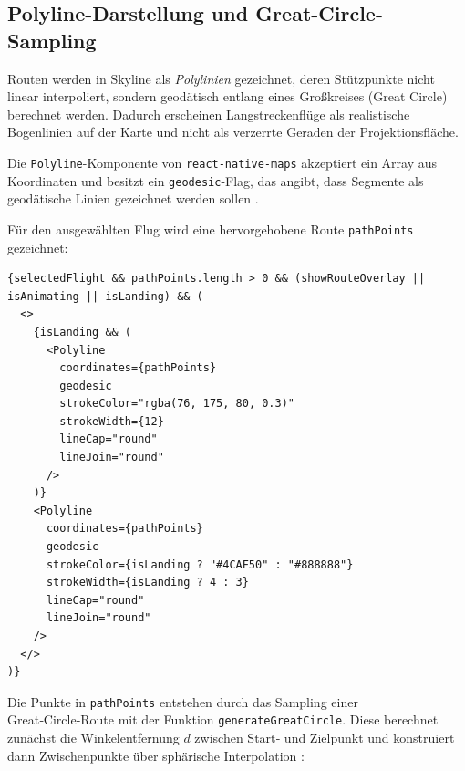 \subsection{Polyline-Darstellung und Great-Circle-Sampling}

Routen werden in Skyline als \emph{Polylinien} gezeichnet, deren Stützpunkte nicht linear interpoliert, sondern geodätisch entlang eines Großkreises (Great Circle) berechnet werden.
Dadurch erscheinen Langstreckenflüge als realistische Bogenlinien auf der Karte und nicht als verzerrte Geraden der Projektionsfläche.

Die \texttt{Polyline}-Komponente von \texttt{react-native-maps} akzeptiert ein Array aus Koordinaten und besitzt ein \texttt{geodesic}-Flag, das angibt, dass Segmente als geodätische Linien gezeichnet werden sollen \cite{reactNativeMaps}.

Für den ausgewählten Flug wird eine hervorgehobene Route \texttt{pathPoints} gezeichnet:

\begin{lstlisting}[style=skyline-ts,
  caption={Hervorgehobene Route f\"ur den ausgew\"ahlten Flug},
  label={lst:selected_flight_polyline}]
{selectedFlight && pathPoints.length > 0 && (showRouteOverlay || isAnimating || isLanding) && (
  <>
    {isLanding && (
      <Polyline
        coordinates={pathPoints}
        geodesic
        strokeColor="rgba(76, 175, 80, 0.3)"
        strokeWidth={12}
        lineCap="round"
        lineJoin="round"
      />
    )}
    <Polyline
      coordinates={pathPoints}
      geodesic
      strokeColor={isLanding ? "#4CAF50" : "#888888"}
      strokeWidth={isLanding ? 4 : 3}
      lineCap="round"
      lineJoin="round"
    />
  </>
)}
\end{lstlisting}

Die Punkte in \texttt{pathPoints} entstehen durch das Sampling einer Great‑Circle‑Route mit der Funktion \texttt{generateGreatCircle}.
Diese berechnet zunächst die Winkelentfernung $d$ zwischen Start‑ und Zielpunkt und konstruiert dann Zwischenpunkte über sphärische Interpolation \cite{movableTypeLatLong}:

